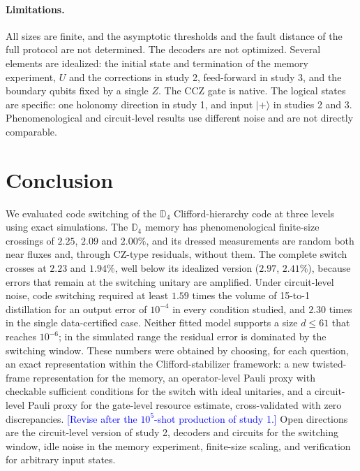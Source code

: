 \documentclass[a4paper]{article}
\newcommand{\blue}[1]{\textcolor{blue}{#1}}
\providecommand{\ket}[1]{\ensuremath{|#1\rangle}}
\begin{document}
\paragraph{Limitations.}
All sizes are finite, and the asymptotic thresholds and the fault distance of the full protocol are not determined. The decoders are not optimized. Several elements are idealized: the initial state and termination of the memory experiment, $U$ and the corrections in study 2, feed-forward in study 3, and the boundary qubits fixed by a single $Z$. The CCZ gate is native. The logical states are specific: one holonomy direction in study 1, and input $\ket{+}$ in studies 2 and 3. Phenomenological and circuit-level results use different noise and are not directly comparable.

\section{Conclusion}
\label{sec:conclusion}

We evaluated code switching of the $\mathbb{D}_4$ Clifford-hierarchy code at three levels using exact simulations. The $\mathbb{D}_4$ memory has phenomenological finite-size crossings of $2.25$, $2.09$ and $2.00\%$, and its dressed measurements are random both near fluxes and, through CZ-type residuals, without them. The complete switch crosses at $2.23$ and $1.94\%$, well below its idealized version ($2.97$, $2.41\%$), because errors that remain at the switching unitary are amplified. Under circuit-level noise, code switching required at least $1.59$ times the volume of 15-to-1 distillation for an output error of $10^{-4}$ in every condition studied, and $2.30$ times in the single data-certified case. Neither fitted model supports a size $d\le61$ that reaches $10^{-6}$; in the simulated range the residual error is dominated by the switching window. These numbers were obtained by choosing, for each question, an exact representation within the Clifford-stabilizer framework: a new twisted-frame representation for the memory, an operator-level Pauli proxy with checkable sufficient conditions for the switch with ideal unitaries, and a circuit-level Pauli proxy for the gate-level resource estimate, cross-validated with zero discrepancies. \blue{[Revise after the $10^5$-shot production of study 1.]} Open directions are the circuit-level version of study 2, decoders and circuits for the switching window, idle noise in the memory experiment, finite-size scaling, and verification for arbitrary input states.
\end{document}
